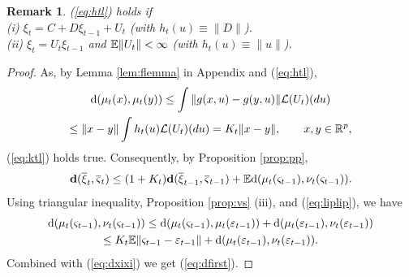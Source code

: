 \documentclass{article}              %
\newtheorem{remark}{Remark}
\begin{document}
\begin{remark}
(\ref{eq:htl}) holds if\\
(i) $\xi_{t}=C+D\xi_{t-1}+U_{t}$ (with $h_{t}(u)\equiv\|D\|$). \\
(ii) $\xi_{t}=U_{t}\xi{}_{t-1}$ and $\mathbb{E} \| U_t \| < \infty$ (with $h_{t}(u)\equiv\|u\|$).
\end{remark}



\begin{proof}
As, by Lemma \ref{lem:flemma} in Appendix and (\ref{eq:htl}),
\begin{multline}
\mathrm{d}(\mu_{t}(x),\mu_{t}(y))\leq\int\|g(x,u)-g(y,u)\|\mathcal{L}(U_{t})(du)
\\
\leq\|x-y\|\int h_{t}(u)\mathcal{L}(U_{t})(du)
=K_t \|x-y\| 
,\qquad x,y\in\mathbb{R}^{p},
\label{eq:liplip}
\end{multline}
(\ref{eq:ktl}) holds true. Consequently, by Proposition \ref{prop:pp},
\begin{equation}
\mathbf{d}(\overline{\xi}_{t},\overline{\varsigma}_{t})\leq(1+K_{t})\mathbf{d}(\overline{\xi}_{t-1},\overline{\varsigma}_{t-1})+\mathbb{E}\mathrm{d}(\mu_{t}(\varsigma_{t-1}),\nu_{t}(\varsigma_{t-1})).
\label{eq:dxixi}
\end{equation}
Using triangular inequality, Proposition \ref{prop:vs} (iii), and (\ref{eq:liplip}), we have
\begin{multline*}
\mathrm{d}(\mu_{t}(\varsigma_{t-1}),\nu_{t}(\varsigma_{t-1}))\leq\mathrm{d}(\mu_{t}(\varsigma_{t-1}),\mu_{t}(\varepsilon_{t-1}))+\mathrm{d}(\mu_{t}(\varepsilon_{t-1}),\nu_{t}(\varepsilon{}_{t-1}))
\\
\leq
K_t \mathbb{E} \|\varsigma_{t-1}-\varepsilon_{t-1}\|+\mathrm{d}(\mu_{t}(\varepsilon_{t-1}),\nu_{t}(\varepsilon{}_{t-1})).
\end{multline*}
Combined with (\ref{eq:dxixi}) we get (\ref{eq:dfirst}). 


\end{proof}
\end{document}
